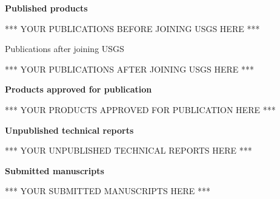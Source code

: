\documentclass[12pt]{article}
\begin{document}
\vspace{10pt}
\raggedright \textbf{Published products} \\
\vspace{10pt}





*** YOUR PUBLICATIONS BEFORE JOINING USGS HERE ***





\centering Publications after joining USGS \\
\vspace{-10pt}
\hrulefill
\raggedright
\vspace{10pt}





*** YOUR PUBLICATIONS AFTER JOINING USGS HERE ***





\vspace{10pt}
\raggedright \textbf{Products approved for publication} \\
\vspace{10pt}





*** YOUR PRODUCTS APPROVED FOR PUBLICATION HERE ***





\vspace{10pt}
\raggedright \textbf{Unpublished technical reports} \\
\vspace{10pt}





*** YOUR UNPUBLISHED TECHNICAL REPORTS HERE ***





\vspace{10pt}
\raggedright \textbf{Submitted manuscripts} \\
\vspace{10pt}





*** YOUR SUBMITTED MANUSCRIPTS HERE ***
\end{document}
